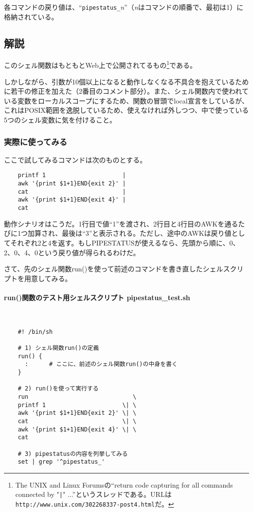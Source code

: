 各コマンドの戻り値は、``\verb|pipestatus_|\textit{n}''（\textit{n}はコマンドの順番で、最初は1）に格納されている。

\subsection*{解説}

このシェル関数はもともとWeb上で公開されてるもの\footnote{The UNIX and Linux Forumsの``return code capturing for all commands connected by "\verb!|!" ...''というスレッドである。URLは\verb|http://www.unix.com/302268337-post4.html|だ。}である。

しかしながら、引数が10個以上になると動作しなくなる不具合を抱えているために若干の修正を加えた（2番目のコメント部分）。また、シェル関数内で使われている変数をローカルスコープにするため、関数の冒頭でlocal宣言をしているが、これはPOSIX範囲を逸脱しているため、使えなければ外しつつ、中で使っている5つのシェル変数に気を付けること。

\subsubsection*{実際に使ってみる}

ここで試してみるコマンドは次のものとする。\\
\begin{frameboxit}{160.0mm}
\begin{verbatim}
	printf 1                      |
	awk '{print $1+1}END{exit 2}' |
	cat                           |
	awk '{print $1+1}END{exit 4}' |
	cat
\end{verbatim}
\end{frameboxit}

動作シナリオはこうだ。1行目で値``1''を渡され、2行目と4行目のAWKを通るたびに1つ加算され、最後は``3''と表示される。ただし、途中のAWKは戻り値としてそれぞれ2と4を返す。もしPIPESTATUSが使えるなら、先頭から順に、0、2、0、4、0という戻り値が得られるわけだ。

さて、先のシェル関数run()を使って前述のコマンドを書き直したシェルスクリプトを用意してみる。
\paragraph{run()関数のテスト用シェルスクリプト pipestatus\_{}test.sh}　\\
\begin{frameboxit}{160.0mm}
\begin{verbatim}
	#! /bin/sh

	# 1) シェル関数run()の定義
	run() {
	  :      # ここに、前述のシェル関数run()の中身を書く
	}

	# 2) run()を使って実行する
	run                              \
	printf 1                      \| \
	awk '{print $1+1}END{exit 2}' \| \
	cat                           \| \
	awk '{print $1+1}END{exit 4}' \| \
	cat

	# 3) pipestatusの内容を列挙してみる
	set | grep '^pipestatus_'
\end{verbatim}
\end{frameboxit}

